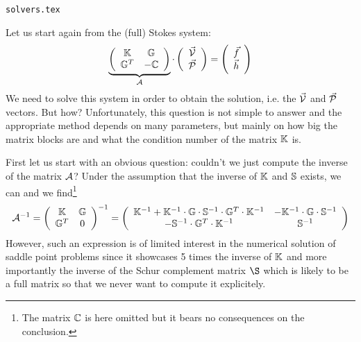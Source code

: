 \begin{flushright} {\tiny {\color{gray} \tt solvers.tex}} \end{flushright}

Let us start again from the (full) Stokes system:
\begin{equation}
\underbrace{
\left(
\begin{array}{cc}
{\mathbb{K}} & {\mathbb{G}} \\ {\mathbb{G}}^T & -{\mathbb{C}} 
\end{array}
\right)
}_{\cal A}
\cdot
\left(
\begin{array}{c}
\vec{\cal V} \\ \vec{\cal P}
\end{array}
\right)
=
\left(
\begin{array}{c}
\vec{f} \\ \vec{h}
\end{array}
\right)
\label{StokesSyst}
\end{equation}
We need to solve this system in order to obtain the solution, i.e. the $\vec{\cal V}$ 
and $\vec{\cal P}$ vectors. But how? 
Unfortunately, this question is not simple to answer and the appropriate method depends on many 
parameters, but mainly on how big the matrix blocks are and what the condition number of the matrix ${\mathbb{K}}$ is. 

First let us start with an obvious question: couldn't we just compute the inverse of the matrix ${\cal A}$?
Under the assumption that the inverse of ${\mathbb{K}}$ and ${\mathbb{S}}$ exists, we can and we find\footnote{The matrix 
${\mathbb{C}}$ is here omitted but it bears no consequences on the conclusion.}
\[
{\cal A}^{-1} = 
\left(
\begin{array}{cc}
{\mathbb{K}} & {\mathbb{G}} \\ {\mathbb{G}}^T & 0
\end{array}
\right)^{-1}
=
\left(
\begin{array}{cc}
{\mathbb{K}}^{-1} + {\mathbb{K}}^{-1} \cdot {\mathbb{G}} \cdot{\mathbb{S}}^{-1} \cdot{\mathbb{G}}^T \cdot{\mathbb{K}}^{-1} & -{\mathbb{K}}^{-1} \cdot{\mathbb{G}} \cdot{\mathbb{S}}^{-1} \\ 
-{\mathbb{S}}^{-1} \cdot{\mathbb{G}}^T \cdot{\mathbb{K}}^{-1}  &  {\mathbb{S}}^{-1}
\end{array}
\right)
\]
However, such an expression is of limited interest in the numerical solution of saddle
point problems since it showcases 5 times the inverse of ${\mathbb{K}}$ and more importantly
the inverse of the Schur complement matrix $\S$ which is likely to be a full matrix so 
that we never want to compute it explicitely.


